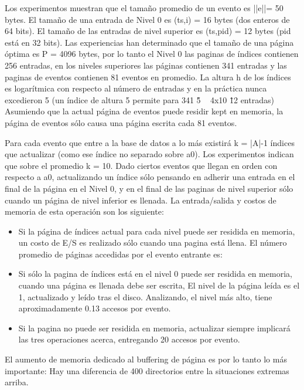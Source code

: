 \documentclass[12pt,legalpaper]{report}
\begin{document}
Los experimentos muestran que el tamaño promedio de un evento es ||e||= 50 bytes.  El tamaño de una entrada de Nivel 0 es (ts,i) = 16 bytes (dos enteros de 64 bits).  El tamaño de las entradas de nivel superior es (ts,pid) = 12 bytes (pid está en 32 bits).  Las experiencias han determinado que el tamaño de una página óptima es P = 4096 bytes, por lo tanto el Nivel 0 las paginas de índices contienen 256 entradas, en los niveles superiores las páginas contienen 341 entradas y las paginas de eventos contienen 81 eventos en promedio.  La altura h de los índices es logarítmica con respecto al número de entradas y en la práctica nunca excedieron 5 (un índice de altura 5 permite para 341 \^ 5 ~ 4x10 \^ 12 entradas)  Asumiendo que la actual página de eventos puede residir {kept} en memoria, la página de eventos sólo causa una página escrita cada 81 eventos.

Para cada evento que entre a la base de datos a lo más existirá k = |A|-1 índices que actualizar (como ese índice no separado sobre a0).  Los experimentos indican que sobre el promedio k = 10.  Dado ciertos eventos que llegan en orden con respecto a a0, actualizando un índice sólo pensando en adherir una entrada en el final de la página en el Nivel 0, y en el final de las paginas de nivel superior sólo cuando un página de nivel inferior es llenada.  La entrada/salida y costos de memoria de esta operación son los siguiente:

\begin{itemize}
	\item Si la página de índices actual para cada nivel puede ser residida en memoria, un costo de E/S es realizado sólo cuando una pagina está llena.  El número promedio de páginas accedidas por el evento entrante es:

	\item Si sólo la pagina de índices está en el nivel 0 puede ser residida en memoria, cuando una página es llenada debe ser escrita, El nivel de la página leída es el 1, actualizado y leído tras el disco.  Analizando, el nivel más alto, tiene aproximadamente 0.13 accesos por evento.  

	\item Si la pagina no puede ser residida en memoria, actualizar siempre implicará las tres operaciones acerca, entregando 20 accesos por evento.
\end{itemize}

	El aumento de memoria dedicado al buffering de página es por lo tanto lo más importante:  Hay una diferencia de  400 directorios entre la situaciones extremas arriba.
\end{document}
